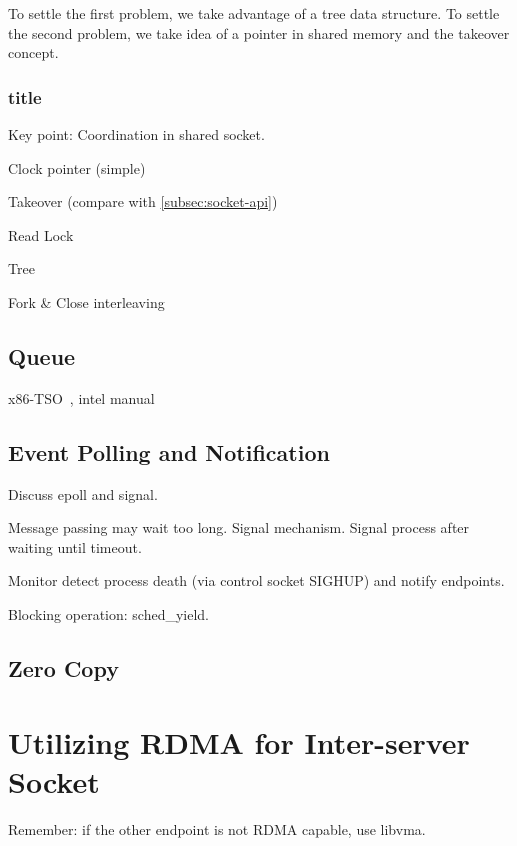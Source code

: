 To settle the first problem, we take advantage of a tree data structure. To settle the second problem, we take idea of a pointer in shared memory and the takeover concept.

\subsubsection{title}  



Key point: Coordination in shared socket.

Clock pointer (simple)

Takeover (compare with \ref{subsec:socket-api})

Read Lock

Tree

Fork \& Close interleaving

\subsection{Queue}

x86-TSO~\cite{sewell2010x86}, intel manual~\cite{intel-manual}

\subsection{Event Polling and Notification}
\label{subsec:epoll}

Discuss epoll and signal.

Message passing may wait too long.
Signal mechanism. Signal process after waiting until timeout.

Monitor detect process death (via control socket SIGHUP) and notify endpoints.

Blocking operation: sched\_yield.


\subsection{Zero Copy}
\label{subsec:zerocopy}




\section{Utilizing RDMA for Inter-server Socket}
\label{sec:rdma}

Remember: if the other endpoint is not RDMA capable, use libvma.
